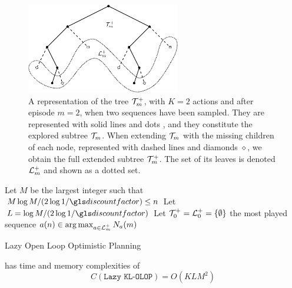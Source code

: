 \begin{subappendices}
\begin{figure}[ht]
	\centering
	\includegraphics[width=0.6\textwidth]{img/tree_svg-tex}
	\caption{A representation of the tree $\mathcal{T}_m^+$, with $K = 2$ actions and after episode $m = 2$, when two sequences have been sampled. They are represented with solid lines and dots \textbullet, and they constitute the explored subtree $\mathcal{T}_m$. When extending $\mathcal{T}_m$ with the missing children of each node, represented with dashed lines and diamonds $\diamond$, we obtain the full extended subtree $\mathcal{T}_m^+$. The set of its leaves is denoted $\mathcal{L}_m^+$ and shown as a dotted set.}
	\label{fig:tree}
\end{figure}

\begin{algorithm}[tp]
	\DontPrintSemicolon
	Let $M$ be the largest integer such that $M \log M/(2 \log 1/\discount) \leq n$\;
	Let $L = \log M / (2 \log 1/\discount)$\;
	Let $\mathcal{T}_0^+ = \mathcal{L}_0^+ = \{\emptyset\}$\;
	\Return the most played sequence $a(n) \in \operatorname*{arg\,max}_{a\in \mathcal{L}_m^+} N_a(m)$
	\caption{Lazy Open Loop Optimistic Planning}
	\label{alg:lazy-kl-olop}
\end{algorithm}


\begin{proposition}
	\begin{leftbar}[propositionbar]
		 has time and memory complexities of
		\begin{equation*}
		C(\texttt{Lazy KL-OLOP}) = O(KLM^2)
		\end{equation*}
		

\end{leftbar}
\end{proposition}
\end{subappendices}
